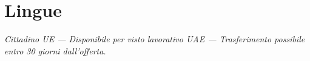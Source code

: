 \documentclass[11pt,a4paper,sans]{moderncv}
\begin{document}
\section{Lingue}

\vfill
\begin{center}
    \footnotesize \textit{Cittadino UE --- Disponibile per visto lavorativo UAE --- Trasferimento possibile entro 30 giorni dall'offerta.}
\end{center}
\end{document}
